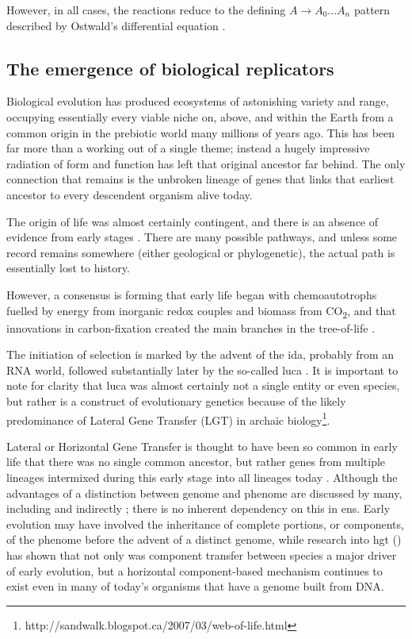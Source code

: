 However, in all cases, the reactions reduce to the defining $A \rightarrow A_0...A_n$ pattern described by Ostwald's differential equation \parencite{Plasson2010}.

\subsection{The emergence of biological replicators}

Biological evolution has produced ecosystems of astonishing variety and range, occupying essentially every viable niche on, above, and within the Earth from a common origin in the prebiotic world many millions of years ago. This has been far more than a working out of a single theme; instead a hugely impressive radiation of form and function has left that original ancestor far behind. The only connection that remains is the unbroken lineage of genes that links that earliest ancestor to every descendent organism alive today.

The origin of life was almost certainly contingent, and there is an absence of evidence from early stages \parencite{Pross2013}. There are many possible pathways, and unless some record remains somewhere (either geological or phylogenetic), the actual path is essentially lost to history.

However, a consensus is forming that early life began with chemoautotrophs fuelled by energy from inorganic redox couples and biomass from CO\textsubscript{2}, and that innovations in carbon-fixation created the main branches in the tree-of-life \parencite{Braakman2012}. 

The initiation of selection is marked by the advent of the \gls{ida}, probably from an RNA world, followed substantially later by the so-called \gls{luca} \parencite{Yarus2011}. It is important to note for clarity that \gls{luca} was almost certainly not a single entity or even species, but rather is a construct of evolutionary genetics because of the likely predominance of Lateral Gene Transfer (LGT) in archaic biology\footnote{http://sandwalk.blogspot.ca/2007/03/web-of-life.html}. 

Lateral or Horizontal Gene Transfer is thought to have been so common in early life that there was no single common ancestor, but rather genes from multiple lineages intermixed during this early stage into all lineages today \parencite{Ragan2009}. Although the advantages of a distinction between genome and phenome are discussed by many, including \parencite[section 7.2.3]{Taylor1999} and indirectly \textcite{VonNeumann1966}; there is no inherent dependency on this in \gls{ens}. Early evolution may have involved the inheritance of complete portions, or components, of the phenome before the advent of a distinct genome, while research into \gls{hgt} (\eg \textcite{Ochman2000,Pace:2008vi,Ragan2009}) has shown that not only was component transfer between species a major driver of early evolution, but a horizontal component-based mechanism continues to exist even in many of today's organisms that have a genome built from DNA. 

